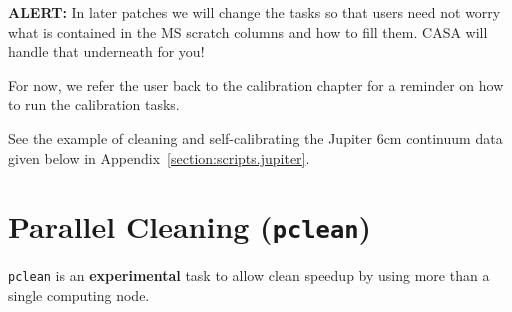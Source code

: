 {\bf ALERT:} In later patches we
will change the tasks so that users need not worry what is contained in
the MS scratch columns and how to fill them.  CASA will handle that 
underneath for you!

For now, we refer the user back to the calibration chapter for
a reminder on how to run the calibration tasks. 

See the example of cleaning and self-calibrating the Jupiter 6cm continuum
data given below in Appendix~\ref{section:scripts.jupiter}.  

\section{Parallel Cleaning ({\tt pclean})}
\label{section:im.pclean}

{\tt pclean} is an {\bf experimental} task to allow clean speedup by using
more than a single computing node. 

